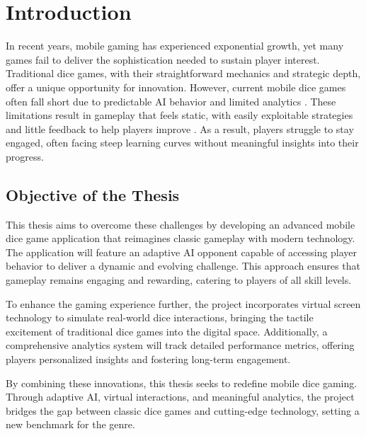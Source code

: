 
\chapter{Introduction}

In recent years, mobile gaming has experienced exponential growth, yet many games fail to deliver the sophistication needed to sustain player interest. Traditional dice games, with their straightforward mechanics and strategic depth, offer a unique opportunity for innovation. However, current mobile dice games often fall short due to predictable AI behavior and limited analytics \cite{bib:appannie}. These limitations result in gameplay that feels static, with easily exploitable strategies and little feedback to help players improve \cite{bib:yannakakis}. As a result, players struggle to stay engaged, often facing steep learning curves without meaningful insights into their progress.

\section{Objective of the Thesis}

This thesis aims to overcome these challenges by developing an advanced mobile dice game application that reimagines classic gameplay with modern technology. The application will feature an adaptive AI opponent capable of accessing player behavior to deliver a dynamic and evolving challenge. This approach ensures that gameplay remains engaging and rewarding, catering to players of all skill levels.

To enhance the gaming experience further, the project incorporates virtual screen technology to simulate real-world dice interactions, bringing the tactile excitement of traditional dice games into the digital space. Additionally, a comprehensive analytics system will track detailed performance metrics, offering players personalized insights and fostering long-term engagement.

By combining these innovations, this thesis seeks to redefine mobile dice gaming. Through adaptive AI, virtual interactions, and meaningful analytics, the project bridges the gap between classic dice games and cutting-edge technology, setting a new benchmark for the genre.

